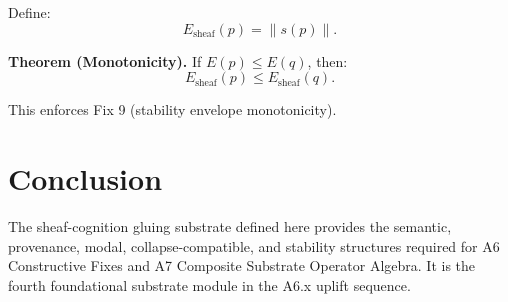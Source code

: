 \documentclass[11pt]{article}
\begin{document}
Define:
\[
E_{\mathrm{sheaf}}(p) = \|s(p)\|.
\]

\textbf{Theorem (Monotonicity).}
If $E(p) \le E(q)$, then:
\[
E_{\mathrm{sheaf}}(p) \le E_{\mathrm{sheaf}}(q).
\]

This enforces Fix 9 (stability envelope monotonicity).

\section{Conclusion}

The sheaf-cognition gluing substrate defined here provides the semantic,
provenance, modal, collapse-compatible, and stability structures required for
A6 Constructive Fixes and A7 Composite Substrate Operator Algebra. It is the
fourth foundational substrate module in the A6.x uplift sequence.
\end{document}
